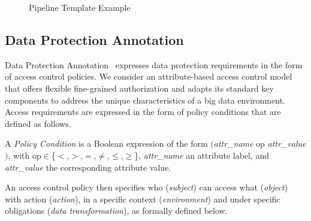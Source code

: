 \begin{figure}[ht!]
  \centering
  \caption{Pipeline Template Example}
  \label{fig:temp}
\end{figure}

\subsection{Data Protection Annotation \myLambda}\label{sec:nonfuncannotation}
Data Protection Annotation \myLambda\ expresses data protection requirements in the form of access control policies. We consider an attribute-based access control model that offers flexible fine-grained authorization and adapts its standard key components to address the unique characteristics of a big data environment. Access requirements are expressed in the form of policy conditions that are defined as follows.

\begin{definition}\label{def:policy_cond}
  A \emph{Policy Condition} is a Boolean expression of the form $($\emph{attr\_name} op \emph{attr\_value}$)$, with op$\in$\{$<$,$>$,$=$,$\neq$,$\leq$,$\geq$\}, \emph{attr\_name} an attribute label, and \emph{attr\_value} the corresponding attribute value.
\end{definition}

An access control policy then specifies who (\emph{subject}) can access what (\emph{object}) with action (\emph{action}), in a specific context (\emph{environment}) and under specific obligations (\emph{data transformation}), as formally defined below.

